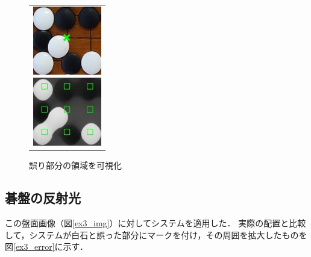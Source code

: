 \documentclass[summary]{nitocs}
\numberwithin{equation}{section}
\begin{document}
            \begin{figure}[tb] %
                \begin{center}
                  \begin{tabular}{c}
                    \begin{minipage}{0.5\hsize}
                      \begin{center}
                        \includegraphics[clip,width=30mm]{DSC_0099/TRIM_resultCompare.jpg}
                    \caption{図\ref{ex2_img}の誤り部分}
                    \label{ex2_error}
                      \end{center}
                    \end{minipage}
                    \begin{minipage}{0.5\hsize}
                      \begin{center}
                        \includegraphics[clip,width=30mm]{DSC_0099/TRIM_boardWithAreaImg.jpg}
                    \caption{誤り部分の領域を可視化}
                    \label{ex2_error_area}
                      \end{center}
                    \end{minipage}
                  \end{tabular}
                \end{center}
            \end{figure}


        \subsection{碁盤の反射光} \label{reflection}%
            この盤面画像（図\ref{ex3_img}）に対してシステムを適用した．
            実際の配置と比較して，システムが白石と誤った部分にマークを付け，その周囲を拡大したものを図\ref{ex3_error}に示す．
\end{document}
